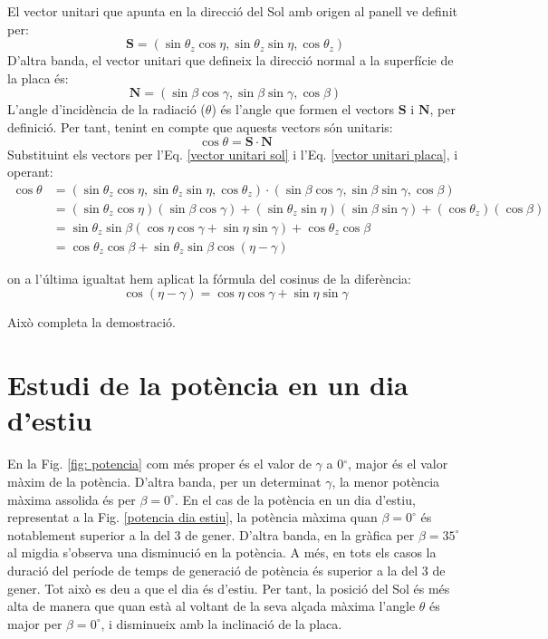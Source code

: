 \documentclass[11pt]{article}
\begin{document}
El vector unitari que apunta en la direcció del Sol amb origen al panell ve definit per:
\begin{equation}
    \mathbf{S} = (\sin \theta_z \cos \eta, \sin \theta_z \sin \eta, \cos \theta_z)
    \label{vector unitari sol}
\end{equation}
D'altra banda, el vector unitari que defineix la direcció normal a la superfície de la placa és:
\begin{equation}
       \mathbf{N} = (\sin \beta \cos \gamma, \sin \beta \sin \gamma, \cos \beta)
       \label{vector unitari placa}
\end{equation}
L'angle d'incidència de la radiació (\(\theta\)) és l'angle que formen el vectors \(\mathbf{S}\) i \(\mathbf{N}\), per definició. Per tant, tenint en compte que aquests vectors són unitaris:
\begin{equation}
    \cos \theta = \mathbf{S} \cdot \mathbf{N}
\end{equation}
Substituint els vectors per l'Eq. \eqref{vector unitari sol} i l'Eq. \eqref{vector unitari placa}, i operant:
\begin{align*}
    \cos \theta &= (\sin \theta_z \cos \eta, \sin \theta_z \sin \eta, \cos \theta_z) \cdot (\sin \beta \cos \gamma, \sin \beta \sin \gamma, \cos \beta) \\
    &= (\sin \theta_z \cos \eta)(\sin \beta \cos \gamma) + (\sin \theta_z \sin \eta)(\sin \beta \sin \gamma) + (\cos \theta_z)(\cos \beta) \\
    &= \sin \theta_z \sin \beta (\cos \eta \cos \gamma + \sin \eta \sin \gamma) + \cos \theta_z \cos \beta \\
    &= \cos \theta_z \cos \beta + \sin \theta_z \sin \beta \cos (\eta - \gamma)
\end{align*}

on a l'última igualtat hem aplicat la fórmula del cosinus de la diferència:
\[
\cos (\eta - \gamma) = \cos \eta \cos \gamma + \sin \eta \sin \gamma
\]

Això completa la demostració.


\section{Estudi de la potència en un dia d'estiu}
\label{sec: dia estiu potencia}

En la Fig. \ref{fig: potencia} com més proper és el valor de $\gamma$ a 0$^{\circ}$, major és el valor màxim de la potència. D'altra banda, per un determinat $\gamma$, la menor potència màxima assolida és per $\beta=0^{\circ}$. En el cas de la potència en un dia d'estiu, representat a la Fig. \ref{potencia dia estiu}, la potència màxima quan $\beta=0^{\circ}$ és notablement superior a la del 3 de gener. D'altra banda, en la gràfica per $\beta=35^{\circ}$ al migdia s'observa una disminució en la potència. A més, en tots els casos la duració del període de temps de generació de potència és superior a la del 3 de gener. Tot això es deu a que el dia és d'estiu. Per tant, la posició del Sol és més alta de manera que quan està al voltant de la seva alçada màxima l’angle $\theta$ és major per $\beta=0^{\circ}$, i disminueix amb la inclinació de la placa.
\end{document}

